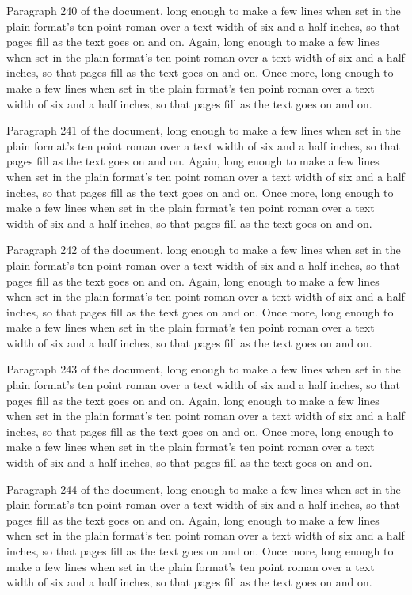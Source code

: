 Paragraph 240 of the document, long enough to make a few lines when set in the plain format's ten point roman over a text width of six and a half inches, so that pages fill as the text goes on and on. Again, long enough to make a few lines when set in the plain format's ten point roman over a text width of six and a half inches, so that pages fill as the text goes on and on. Once more, long enough to make a few lines when set in the plain format's ten point roman over a text width of six and a half inches, so that pages fill as the text goes on and on.

Paragraph 241 of the document, long enough to make a few lines when set in the plain format's ten point roman over a text width of six and a half inches, so that pages fill as the text goes on and on. Again, long enough to make a few lines when set in the plain format's ten point roman over a text width of six and a half inches, so that pages fill as the text goes on and on. Once more, long enough to make a few lines when set in the plain format's ten point roman over a text width of six and a half inches, so that pages fill as the text goes on and on.

Paragraph 242 of the document, long enough to make a few lines when set in the plain format's ten point roman over a text width of six and a half inches, so that pages fill as the text goes on and on. Again, long enough to make a few lines when set in the plain format's ten point roman over a text width of six and a half inches, so that pages fill as the text goes on and on. Once more, long enough to make a few lines when set in the plain format's ten point roman over a text width of six and a half inches, so that pages fill as the text goes on and on.

Paragraph 243 of the document, long enough to make a few lines when set in the plain format's ten point roman over a text width of six and a half inches, so that pages fill as the text goes on and on. Again, long enough to make a few lines when set in the plain format's ten point roman over a text width of six and a half inches, so that pages fill as the text goes on and on. Once more, long enough to make a few lines when set in the plain format's ten point roman over a text width of six and a half inches, so that pages fill as the text goes on and on.

Paragraph 244 of the document, long enough to make a few lines when set in the plain format's ten point roman over a text width of six and a half inches, so that pages fill as the text goes on and on. Again, long enough to make a few lines when set in the plain format's ten point roman over a text width of six and a half inches, so that pages fill as the text goes on and on. Once more, long enough to make a few lines when set in the plain format's ten point roman over a text width of six and a half inches, so that pages fill as the text goes on and on.

